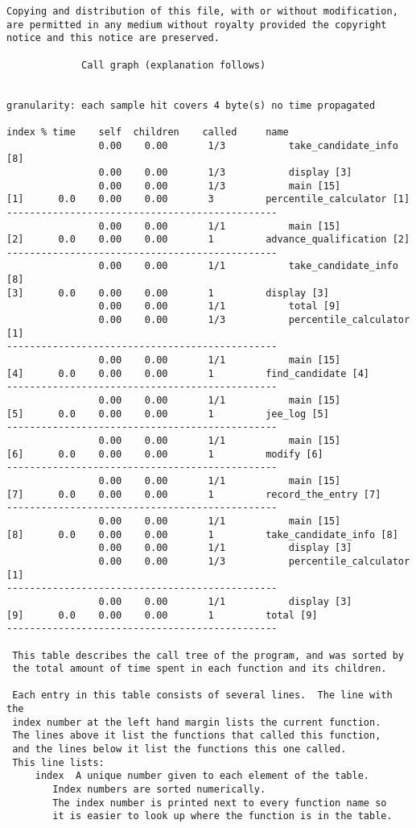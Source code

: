 \documentclass{article}
\begin{document}
\begin{verbatim}
Copying and distribution of this file, with or without modification,
are permitted in any medium without royalty provided the copyright
notice and this notice are preserved.

		     Call graph (explanation follows)


granularity: each sample hit covers 4 byte(s) no time propagated

index % time    self  children    called     name
                0.00    0.00       1/3           take_candidate_info [8]
                0.00    0.00       1/3           display [3]
                0.00    0.00       1/3           main [15]
[1]      0.0    0.00    0.00       3         percentile_calculator [1]
-----------------------------------------------
                0.00    0.00       1/1           main [15]
[2]      0.0    0.00    0.00       1         advance_qualification [2]
-----------------------------------------------
                0.00    0.00       1/1           take_candidate_info [8]
[3]      0.0    0.00    0.00       1         display [3]
                0.00    0.00       1/1           total [9]
                0.00    0.00       1/3           percentile_calculator [1]
-----------------------------------------------
                0.00    0.00       1/1           main [15]
[4]      0.0    0.00    0.00       1         find_candidate [4]
-----------------------------------------------
                0.00    0.00       1/1           main [15]
[5]      0.0    0.00    0.00       1         jee_log [5]
-----------------------------------------------
                0.00    0.00       1/1           main [15]
[6]      0.0    0.00    0.00       1         modify [6]
-----------------------------------------------
                0.00    0.00       1/1           main [15]
[7]      0.0    0.00    0.00       1         record_the_entry [7]
-----------------------------------------------
                0.00    0.00       1/1           main [15]
[8]      0.0    0.00    0.00       1         take_candidate_info [8]
                0.00    0.00       1/1           display [3]
                0.00    0.00       1/3           percentile_calculator [1]
-----------------------------------------------
                0.00    0.00       1/1           display [3]
[9]      0.0    0.00    0.00       1         total [9]
-----------------------------------------------

 This table describes the call tree of the program, and was sorted by
 the total amount of time spent in each function and its children.

 Each entry in this table consists of several lines.  The line with the
 index number at the left hand margin lists the current function.
 The lines above it list the functions that called this function,
 and the lines below it list the functions this one called.
 This line lists:
     index	A unique number given to each element of the table.
		Index numbers are sorted numerically.
		The index number is printed next to every function name so
		it is easier to look up where the function is in the table.


\end{verbatim}
\end{document}

